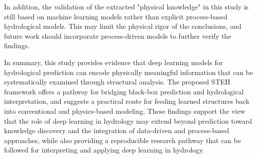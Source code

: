 In addition, the validation of the extracted "physical knowledge" in this study is still based on machine learning models rather than explicit process-based hydrological models\cite{gmd-11-3481-2018}. This may limit the physical rigor of the conclusions, and future work should incorporate process-driven models to further verify the findings.

In summary, this study provides evidence that deep learning models for hydrological prediction can encode physically meaningful information that can be systematically examined through structural analysis. The proposed STEH framework offers a pathway for bridging black-box prediction and hydrological interpretation, and suggests a practical route for feeding learned structures back into conventional and physics-based modeling. These findings support the view that the role of deep learning in hydrology may extend beyond prediction toward knowledge discovery and the integration of data-driven and process-based approaches, while also providing a reproducible research pathway that can be followed for interpreting and applying deep learning in hydrology.